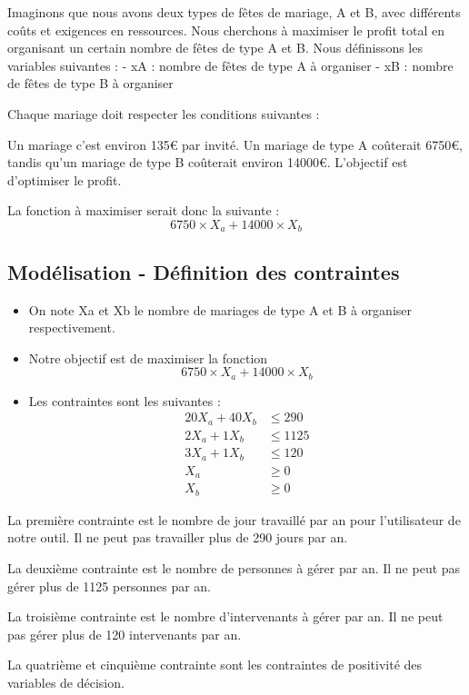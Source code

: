 \documentclass[
]{article}
\providecommand{\tightlist}{%
  \setlength{\itemsep}{0pt}\setlength{\parskip}{0pt}}
\begin{document}
Imaginons que nous avons deux types de fêtes de mariage, A et B, avec
différents coûts et exigences en ressources. Nous cherchons à maximiser
le profit total en organisant un certain nombre de fêtes de type A et B.
Nous définissons les variables suivantes : - xA : nombre de fêtes de
type A à organiser - xB : nombre de fêtes de type B à organiser

Chaque mariage doit respecter les conditions suivantes :

Un mariage c'est environ 135€ par invité. Un mariage de type A coûterait
6750€, tandis qu'un mariage de type B coûterait environ 14000€.
L'objectif est d'optimiser le profit.

La fonction à maximiser serait donc la suivante : \[
6750\times X_a + 14000\times X_b
\]

\subsection{Modélisation - Définition des
contraintes}\label{moduxe9lisation---duxe9finition-des-contraintes}

\begin{itemize}
\tightlist
\item
  On note Xa et Xb le nombre de mariages de type A et B à organiser
  respectivement.
\item
  Notre objectif est de maximiser la fonction \[
  6750\times X_a + 14000\times X_b
  \]
\item
  Les contraintes sont les suivantes : \[
  \begin{align}
  20X_a + 40X_b &\leq 290 \\
  2X_a + 1X_b &\leq 1125 \\
  3X_a + 1X_b &\leq 120 \\
  X_a &\geq 0 \\
  X_b &\geq 0
  \end{align}
  \]
\end{itemize}

La première contrainte est le nombre de jour travaillé par an pour
l'utilisateur de notre outil. Il ne peut pas travailler plus de 290
jours par an.

La deuxième contrainte est le nombre de personnes à gérer par an. Il ne
peut pas gérer plus de 1125 personnes par an.

La troisième contrainte est le nombre d'intervenants à gérer par an. Il
ne peut pas gérer plus de 120 intervenants par an.

La quatrième et cinquième contrainte sont les contraintes de positivité
des variables de décision.
\end{document}
